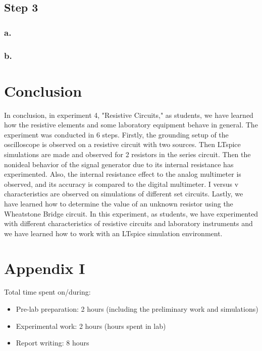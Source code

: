 \documentclass[letterpaper,12pt]{article}
\begin{document}
\subsection{Step 3}
\subsubsection{a.}
\subsubsection{b.}


\section{Conclusion}
In conclusion, in experiment 4, "Resistive Circuits," as students, we have learned how the resistive elements and some laboratory equipment behave in general. The experiment was conducted in 6 steps. Firstly, the grounding setup of the oscilloscope is observed on a resistive circuit with two sources. Then LTspice simulations are made and observed for 2 resistors in the series circuit. Then the nonideal behavior of the signal generator due to its internal resistance has experimented. Also, the internal resistance effect to the analog multimeter is observed, and its accuracy is compared to the digital multimeter. I versus v characteristics are observed on simulations of different set circuits. Lastly, we have learned how to determine the value of an unknown resistor using the Wheatstone Bridge circuit.  In this experiment, as students, we have experimented with different characteristics of resistive circuits and laboratory instruments and we have learned how to work with an LTspice simulation environment.
\section*{Appendix I}
Total time spent on/during:
\begin{itemize}
	\item Pre-lab preparation: 2 hours (including the preliminary work and simulations) 
	\item Experimental work: 2 hours (hours spent in lab)
	\item Report writing: 8 hours 
\end{itemize}



\end{document}
